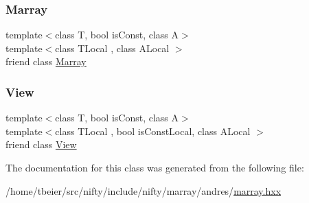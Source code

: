 \subsubsection{\texorpdfstring{Marray}{Marray}}
{\footnotesize\ttfamily template$<$class T, bool is\+Const, class A$>$ \\
template$<$class T\+Local , class A\+Local $>$ \\
friend class \hyperlink{classandres_1_1Marray}{Marray}\hspace{0.3cm}{\ttfamily [friend]}}

\mbox{\label{classandres_1_1View_a2658181be4befdf722462ab951ba8a67}} 
\subsubsection{\texorpdfstring{View}{View}}
{\footnotesize\ttfamily template$<$class T, bool is\+Const, class A$>$ \\
template$<$class T\+Local , bool is\+Const\+Local, class A\+Local $>$ \\
friend class \hyperlink{classandres_1_1View}{View}\hspace{0.3cm}{\ttfamily [friend]}}



The documentation for this class was generated from the following file\+:\begin{DoxyCompactItemize}
\item 
/home/tbeier/src/nifty/include/nifty/marray/andres/\hyperlink{andres_2marray_8hxx}{marray.\+hxx}\end{DoxyCompactItemize}
